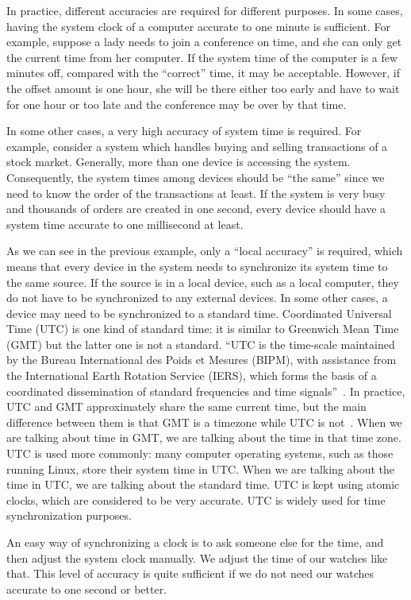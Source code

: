 In practice, different accuracies are required for different purposes. 
In some cases, having the system clock of a computer accurate to one
minute is sufficient. For example, suppose a lady needs to join a conference on
time, and she can only get the current time from her computer. If the system
time of the computer is a few minutes off, compared with the ``correct'' time,
it may be acceptable. However, if the offset amount is one hour, she will be
there either too early and have to wait for one hour or too late and the
conference may be over by that time.

In some other cases, a very high accuracy of system time is required. For
example, consider a system which handles buying and selling transactions of a
stock market.  Generally, more than one device is accessing the system.
Consequently, the system times among devices should be ``the same'' since we
need to know the order of the transactions at least. If the system is very busy
and thousands of orders are created in one second, every device should have a
system time accurate to one millisecond at least.

As we can see in the previous example, only a ``local accuracy'' is required,
which means that every device in the system needs to synchronize its system
time to the same source. If the source is in a local device, such as a local
computer, they do not
have to be synchronized to any external devices. In some other cases, a device
may need to be synchronized to a standard time. 
Coordinated Universal Time (UTC) is one kind of standard time: it is similar 
to Greenwich Mean Time (GMT) but the latter one is not a standard.
``UTC is the time-scale maintained by the Bureau International des Poids et
Mesures (BIPM), with assistance from the International Earth Rotation Service
(IERS), which forms the basis of a coordinated dissemination of standard
frequencies and time signals''~\cite{utc_def}.
In practice, UTC and GMT approximately share the same current time, but the
main difference
between them is that GMT is a timezone while UTC is not~\cite{utc}. When we are
talking about time in GMT\null, we are talking about the time in that time
zone.  UTC is used more commonly: many computer operating systems, such as
those running Linux, store their system time in UTC\null. When we are talking
about the time in UTC, we are talking about the standard time. UTC is kept
using atomic clocks, which are considered to be very accurate. UTC is widely
used for time synchronization purposes.

An easy way of synchronizing a clock is to ask someone else for the time, and
then adjust the system clock manually. We adjust the time of our
watches like that. This level of accuracy is quite sufficient if we do not need
our watches accurate to one second or better. 

